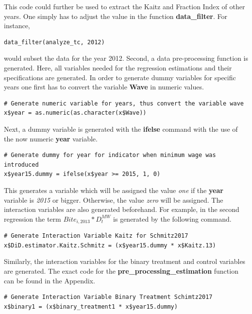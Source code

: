 \documentclass[a4paper]{article}
\begin{document}
{This code could further be used to extract the Kaitz and Fraction Index of other years. One simply has to adjust the value in the function \textbf{data\_filter}.
For instance,
\begin{lstlisting}
data_filter(analyze_tc, 2012)
\end{lstlisting}
would subset the data for the year 2012. Second, a data pre-processing function is generated.
Here, all variables needed for the regression estimations and their specifications are generated. In order to generate dummy variables for specific years one first has to convert the variable \textbf{Wave} in numeric values.
\begin{lstlisting}
# Generate numeric variable for years, thus convert the variable wave
x$year = as.numeric(as.character(x$Wave))
\end{lstlisting}
Next, a dummy variable is generated with the \textbf{ifelse} command with the use of the now numeric \textbf{year} variable.
\begin{lstlisting}
# Generate dummy for year for indicator when minimum wage was introduced
x$year15.dummy = ifelse(x$year >= 2015, 1, 0)
\end{lstlisting}
This generates a variable which will be assigned the value \textit{one} if the \textbf{year} variable is \textit{2015} or bigger. Otherwise, the value \textit{zero} will be assigned.
The interaction variables are also generated beforehand. For example, in the second regression the term $Bite_{i, 2013} * D_t^{MW}$ is generated by the following command.
\begin{lstlisting}
# Generate Interaction Variable Kaitz for Schmitz2017
x$DiD.estimator.Kaitz.Schmitz = (x$year15.dummy * x$Kaitz.13)
\end{lstlisting}
Similarly, the interaction variables for the binary treatment and control variables are generated. The exact code for the \textbf{pre\_processing\_estimation} function can be found in the Appendix.
\begin{lstlisting}
# Generate Interaction Variable Binary Treatment Schimtz2017
x$binary1 = (x$binary_treatment1 * x$year15.dummy)


\end{lstlisting}}
\end{document}
